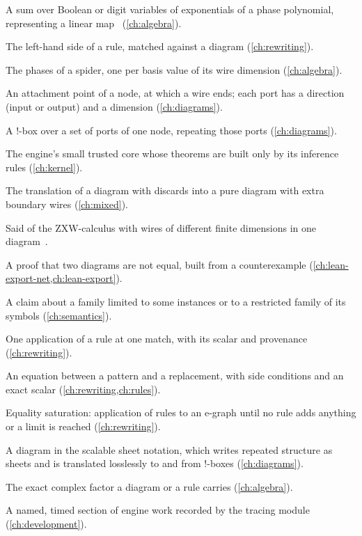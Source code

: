 \begin{description}[style=nextline,leftmargin=1.5em,font=\normalfont\bfseries]
\item[path sum] A sum over Boolean or digit variables of exponentials of a phase polynomial, representing a linear map~\cite{amy2018pathsums} (\cref{ch:algebra}).
\item[pattern] The left-hand side of a rule, matched against a diagram (\cref{ch:rewriting}).
\item[phase vector] The phases of a spider, one per basis value of its wire dimension (\cref{ch:algebra}).
\item[port] An attachment point of a node, at which a wire ends; each port has a direction (input or output) and a dimension (\cref{ch:diagrams}).
\item[port-scoped !-box] A !-box over a set of ports of one node, repeating those ports (\cref{ch:diagrams}).
\item[proof kernel] The engine's small trusted core whose theorems are built only by its inference rules (\cref{ch:kernel}).
\item[purification] The translation of a diagram with discards into a pure diagram with extra boundary wires (\cref{ch:mixed}).
\item[qufinite] Said of the ZXW-calculus with wires of different finite dimensions in one diagram~\cite{wang2023qufinitezxw}.
\item[refutation] A proof that two diagrams are not equal, built from a counterexample (\cref{ch:lean-export-net,ch:lean-export}).
\item[restriction] A claim about a family limited to some instances or to a restricted family of its symbols (\cref{ch:semantics}).
\item[rewrite step] One application of a rule at one match, with its scalar and provenance (\cref{ch:rewriting}).
\item[rule] An equation between a pattern and a replacement, with side conditions and an exact scalar (\cref{ch:rewriting,ch:rules}).
\item[saturation] Equality saturation: application of rules to an e-graph until no rule adds anything or a limit is reached (\cref{ch:rewriting}).
\item[scalable diagram] A diagram in the scalable sheet notation, which writes repeated structure as sheets and is translated losslessly to and from !-boxes (\cref{ch:diagrams}).
\item[scalar] The exact complex factor a diagram or a rule carries (\cref{ch:algebra}).
\item[span] A named, timed section of engine work recorded by the tracing module (\cref{ch:development}).

\end{description}

